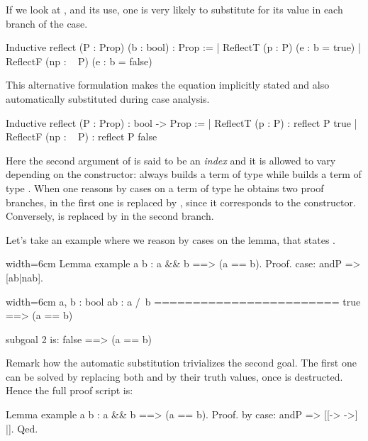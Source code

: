 If we look at , and its use, one is very likely to substitute 
for its value in each branch of the case.

\begin{coq}{}{}
Inductive reflect (P : Prop) (b : bool) : Prop :=
| ReflectT (p : P)    (e : b = true)
| ReflectF (np : ~ P) (e : b = false)
\end{coq}

This alternative formulation makes the equation implicitly stated and
also automatically substituted during case analysis.

\begin{coq}{}{}
Inductive reflect (P : Prop) : bool -> Prop :=
| ReflectT (p : P)    : reflect P true
| ReflectF (np : ~ P) : reflect P false
\end{coq}

Here the second argument of  is said to be an \emph{index}
and it is allowed to vary depending on the constructor:  always
builds a term of type  while  builds
a term of type .  When one reasons
by cases on a term of type  he obtains two proof
branches, in the first one  is replaced by , since it
corresponds to the  constructor.  Conversely,
 is replaced by  in the second branch.

Let's take an example where we reason by cases on the  lemma,
that states .

\begin{coq}{}{width=6cm}
Lemma example a b :
  a && b ==> (a == b).
Proof.
case: andP => [ab|nab].
\end{coq}
\begin{coqout}{}{width=6cm}
a, b : bool
ab : a /\ b
========================
true ==> (a == b)

subgoal 2 is:
false ==> (a == b)
\end{coqout}

Remark how the automatic substitution trivializes the
second goal.  The first one can be solved by replacing
both  and  by their truth values, once 
is destructed.  Hence the full proof script is:

\begin{coq}{}{}
Lemma example a b : a && b ==> (a == b).
Proof. by case: andP => [[-> ->] |]. Qed.
\end{coq}

